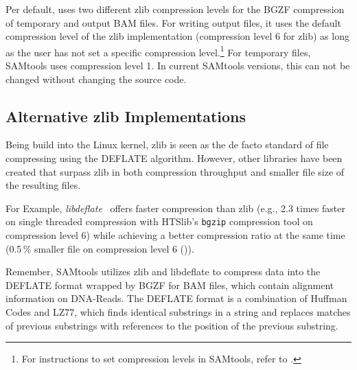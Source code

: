 Per default, \sort uses two different zlib compression levels for the BGZF compression of temporary and output BAM files. For writing output files, it uses the default compression level of the zlib implementation (compression level 6 for zlib) as long as the user has not set a specific compression level.\footnote{For instructions to set compression levels in SAMtools, refer to .} For temporary files, SAMtools uses compression level 1. In current SAMtools versions, this can not be changed without changing the source code.


\subsection{Alternative zlib Implementations}\label{altZlibs}
Being build into the Linux kernel, zlib is seen as the de facto standard of file compressing using the DEFLATE algorithm. However, other libraries have been created that surpass zlib in both compression throughput and smaller file size of the resulting files.

For Example, \textit{libdeflate}~\cite{biggers_ebiggerslibdeflate_2024} offers faster compression than zlib (e.g., 2.3 times faster on single threaded compression with HTSlib's \texttt{bgzip} compression tool on compression level 6) while achieving a better compression ratio at the same time (0.5\,\% smaller file on compression level 6 ()).

Remember, SAMtools utilizes zlib and libdeflate to compress data into the DEFLATE format wrapped by BGZF for BAM files, which contain alignment information on DNA-Reads. The DEFLATE format is a combination of Huffman Codes and LZ77, which finds identical substrings in a string and replaces matches of previous substrings with references to the position of the previous substring.

